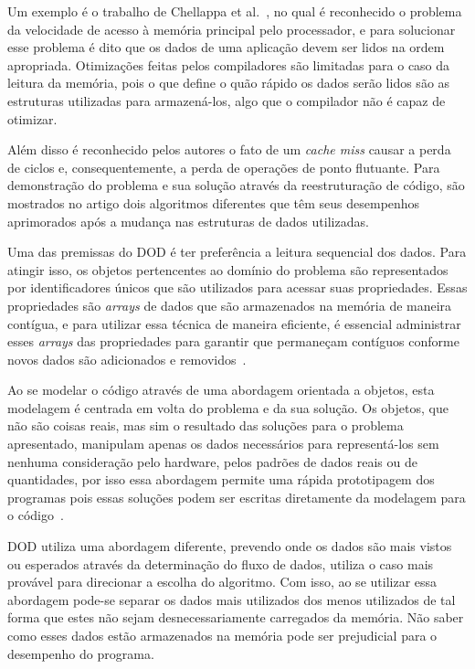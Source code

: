 Um exemplo é o trabalho de Chellappa et al.~\cite{chellappa2008write}, no 
qual é reconhecido o problema da velocidade de acesso à memória principal pelo 
processador, e para solucionar esse problema é dito que os dados de uma aplicação devem 
ser lidos na ordem apropriada. Otimizações feitas pelos compiladores são 
limitadas para o caso da leitura da memória, pois o que define o quão rápido 
os dados serão lidos são as estruturas utilizadas para armazená-los, 
algo que o compilador não é capaz de otimizar. 

Além disso é reconhecido pelos autores o fato de um \textit{cache miss} causar a perda de 
ciclos e, consequentemente, a perda de operações de ponto flutuante. Para demonstração do 
problema e sua solução através da reestruturação de código, são mostrados no artigo 
dois algoritmos diferentes que têm seus desempenhos aprimorados após a mudança nas 
estruturas de dados utilizadas.

Uma das premissas do DOD é ter preferência a leitura sequencial dos dados. Para atingir 
isso, os objetos pertencentes ao domínio do problema são representados por 
identificadores únicos que são utilizados para acessar suas propriedades. Essas 
propriedades são \textit{arrays} de dados que são armazenados na memória de maneira 
contígua, e para utilizar essa técnica de maneira eficiente, é essencial administrar 
esses \textit{arrays} das propriedades para garantir que permaneçam contíguos conforme 
novos dados são adicionados e removidos~\cite{Fontana2017}.

Ao se modelar o código através de uma abordagem orientada a objetos, esta modelagem 
é centrada em volta do problema e da sua solução. Os objetos, que não são coisas reais, 
mas sim o resultado das soluções para o problema apresentado, manipulam apenas os dados 
necessários para representá-los sem nenhuma consideração pelo hardware, pelos 
padrões de dados reais ou de quantidades, por isso essa abordagem permite uma rápida 
prototipagem dos programas pois essas soluções podem ser escritas diretamente da 
modelagem para o código~\cite{fabiandod}.

DOD utiliza uma abordagem diferente, prevendo onde os dados são mais vistos ou 
esperados através da determinação do fluxo de dados, utiliza o caso 
mais provável para direcionar a escolha do algoritmo. Com isso, ao se utilizar essa 
abordagem pode-se separar os dados mais utilizados dos menos utilizados de tal forma 
que estes não sejam desnecessariamente carregados da memória. Não 
saber como esses dados estão armazenados na memória pode ser 
prejudicial para o desempenho do programa.


